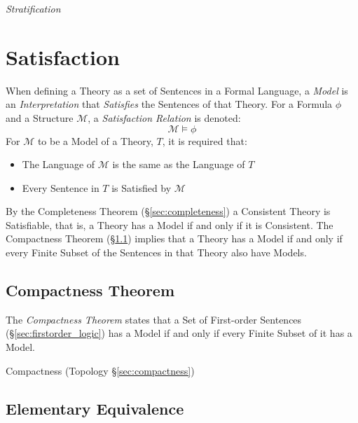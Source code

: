 \emph{Stratification}



\section{Satisfaction}\label{sec:satisfaction}

When defining a Theory as a set of Sentences in a Formal Language, a
\emph{Model} is an \emph{Interpretation} that \emph{Satisfies} the
Sentences of that Theory. For a Formula $\phi$ and a Structure
$\mathcal{M}$, a \emph{Satisfaction Relation} is denoted:
\[
    \mathcal{M} \vDash \phi
\]
For $\mathcal{M}$ to be a Model of a Theory, $T$, it is required that:
\begin{itemize}
\item The Language of $\mathcal{M}$ is the same as the Language of $T$
\item Every Sentence in $T$ is Satisfied by $\mathcal{M}$
\end{itemize}
By the Completeness Theorem (\S\ref{sec:completeness}) a Consistent
Theory is Satisfiable, that is, a Theory has a Model if and only if it
is Consistent. The Compactness Theorem
(\S\ref{sec:compactness_theorem}) implies that a Theory has a Model if
and only if every Finite Subset of the Sentences in that Theory also
have Models.



\subsection{Compactness Theorem}\label{sec:compactness_theorem}

The \emph{Compactness Theorem} states that a Set of First-order
Sentences (\S\ref{sec:firstorder_logic}) has a Model if and only if
every Finite Subset of it has a Model.

Compactness (Topology \S\ref{sec:compactness})



\subsection{Elementary Equivalence}\label{sec:elementary_equivalence}

